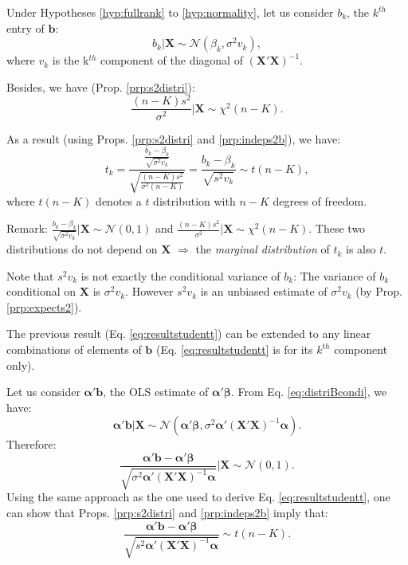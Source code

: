 \documentclass[
]{book}
\theoremstyle{definition}
\theoremstyle{definition}
\theoremstyle{definition}
\theoremstyle{definition}
\theoremstyle{remark}
\begin{document}
Under Hypotheses \ref{hyp:fullrank} to \ref{hyp:normality}, let us consider \(b_k\), the \(k^{th}\) entry of \(\mathbf{b}\):
\[
b_k | \mathbf{X} \sim \mathcal{N}(\beta_k,\sigma^2 v_k),
\]
where \(v_k\) is the k\(^{th}\) component of the diagonal of \((\mathbf{X}'\mathbf{X})^{-1}\).

Besides, we have (Prop. \ref{prp:s2distri}):
\[
\frac{(n-K)s^2}{\sigma^2} | \mathbf{X} \sim \chi ^2 (n-K).
\]

As a result (using Props. \ref{prp:s2distri} and \ref{prp:indeps2b}), we have:
\begin{equation}
\boxed{t_k = \frac{\frac{b_k - \beta_k}{\sqrt{\sigma^2 v_k}}}{\sqrt{\frac{(n-K)s^2}{\sigma^2(n-K)}}} = \frac{b_k - \beta_k}{\sqrt{s^2v_k}} \sim t(n-K),}\label{eq:resultstudentt}
\end{equation}
where \(t(n-K)\) denotes a \(t\) distribution with \(n-K\) degrees of freedom.

Remark: \(\frac{b_k - \beta_k}{\sqrt{\sigma^2 v_k}} | \mathbf{X} \sim \mathcal{N}(0,1)\) and \(\frac{(n-K)s^2}{\sigma^2} | \mathbf{X} \sim \chi ^2 (n-K)\). These two distributions do not depend on \(\mathbf{X}\) \(\Rightarrow\) the \emph{marginal distribution} of \(t_k\) is also \(t\).

Note that \(s^2 v_k\) is not exactly the conditional variance of \(b_k\): The variance of \(b_k\) conditional on \(\mathbf{X}\) is \(\sigma^2 v_k\). However \(s^2 v_k\) is an unbiased estimate of \(\sigma^2 v_k\) (by Prop. \ref{prp:expects2}).

The previous result (Eq. \eqref{eq:resultstudentt}) can be extended to any linear combinations of elements of \(\mathbf{b}\) (Eq. \eqref{eq:resultstudentt} is for its \(k^{th}\) component only).

Let us consider \(\boldsymbol\alpha'\mathbf{b}\), the OLS estimate of \(\boldsymbol\alpha'\boldsymbol\beta\). From Eq. \eqref{eq:distriBcondi}, we have:
\[
\boldsymbol\alpha'\mathbf{b} | \mathbf{X} \sim \mathcal{N}(\boldsymbol\alpha'\boldsymbol\beta,\sigma^2 \boldsymbol\alpha'(\mathbf{X}'\mathbf{X})^{-1}\boldsymbol\alpha).
\]
Therefore:
\[
\frac{\boldsymbol\alpha'\mathbf{b} - \boldsymbol\alpha'\boldsymbol\beta}{\sqrt{\sigma^2 \boldsymbol\alpha'(\mathbf{X}'\mathbf{X})^{-1}\boldsymbol\alpha}} | \mathbf{X} \sim \mathcal{N}(0,1).
\]
Using the same approach as the one used to derive Eq. \eqref{eq:resultstudentt}, one can show that Props. \ref{prp:s2distri} and \ref{prp:indeps2b} imply that:
\begin{equation}
\boxed{\frac{\boldsymbol\alpha'\mathbf{b} - \boldsymbol\alpha'\boldsymbol\beta}{\sqrt{s^2\boldsymbol\alpha'(\mathbf{X}'\mathbf{X})^{-1}\boldsymbol\alpha}} \sim t(n-K).}\label{eq:resultstudentt2}
\end{equation}
\end{document}
